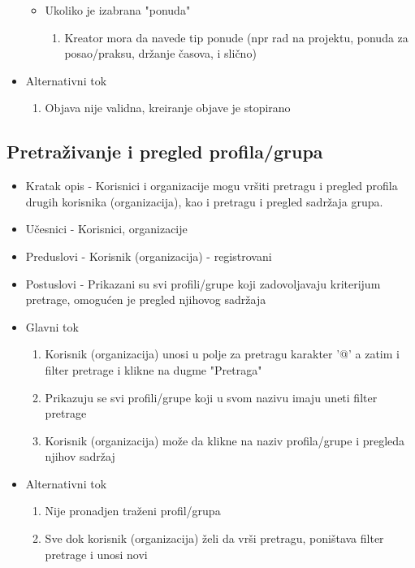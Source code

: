 \begin{itemize}
\begin{itemize}
\begin{enumerate}
            	\end{enumerate}
         	\item Ukoliko je izabrana "ponuda"
            	\begin{enumerate}
            		\item Kreator mora da navede tip ponude (npr rad na projektu, ponuda za posao/praksu, držanje časova, i slično)
            	\end{enumerate}    
	 \end{itemize}
	 \item Alternativni tok
	 \begin{enumerate} 
	 	\item Objava nije validna, kreiranje objave je stopirano
	 \end{enumerate}
\end{itemize}


\subsection{Pretraživanje i pregled profila/grupa}
\begin{itemize}
	\item Kratak opis - Korisnici i organizacije mogu vršiti pretragu i pregled profila drugih korisnika (organizacija), kao i pretragu i pregled sadržaja grupa.
	\item Učesnici - Korisnici, organizacije
	\item Preduslovi - Korisnik (organizacija) - registrovani
	\item Postuslovi - Prikazani su svi profili/grupe koji zadovoljavaju kriterijum pretrage, omogućen je pregled njihovog sadržaja
	\item Glavni tok
	\begin{enumerate}
		\item Korisnik (organizacija) unosi u polje za pretragu karakter '@' a zatim i filter pretrage i klikne na dugme "Pretraga"
		\item Prikazuju se svi profili/grupe koji u svom nazivu imaju uneti filter pretrage
		\item Korisnik (organizacija) može da klikne na naziv profila/grupe i pregleda njihov sadržaj
	\end{enumerate}
	\item Alternativni tok
	\begin{enumerate}
		\item Nije pronadjen traženi profil/grupa
		\item Sve dok korisnik (organizacija) želi da vrši pretragu, poništava filter pretrage i unosi novi
	\end{enumerate}
\end{itemize}


